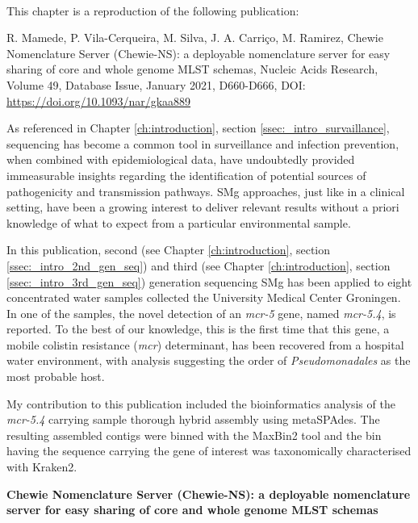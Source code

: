 \mbox{}\\
\vspace{8cm}

This chapter is a reproduction of the following publication:

R. Mamede, P. Vila-Cerqueira, M. Silva, J. A. Carriço, M. Ramirez, Chewie Nomenclature Server (Chewie-NS): a deployable nomenclature server for easy sharing of core and whole genome MLST schemas, Nucleic Acids Research, Volume 49, Database Issue, January 2021, D660-D666, DOI: \url{https://doi.org/10.1093/nar/gkaa889}

As referenced in Chapter \ref{ch:introduction}, section \ref{ssec:_intro_survaillance}, sequencing has become a common tool in surveillance and infection prevention, when combined with epidemiological data, have undoubtedly provided immeasurable insights regarding the identification of potential sources of pathogenicity and transmission pathways. \ac{SMg} approaches, just like in a clinical setting, have been a growing interest to deliver relevant results without a priori knowledge of what to expect from a particular environmental sample. 

In this publication, second (see Chapter \ref{ch:introduction}, section \ref{ssec:_intro_2nd_gen_seq}) and third (see Chapter \ref{ch:introduction}, section \ref{ssec:_intro_3rd_gen_seq}) generation sequencing \ac{SMg} has been applied to eight concentrated water samples collected the University Medical Center Groningen. In one of the samples, the novel detection of an \textit{mcr-5} gene, named \textit{mcr-5.4}, is reported. To the best of our knowledge, this is the first time that this gene, a mobile colistin resistance (\textit{mcr}) determinant, has been recovered from a hospital water environment, with analysis suggesting the order of \textit{Pseudomonadales} as the most probable host. 

My contribution to this publication included the bioinformatics analysis of the \textit{mcr-5.4} carrying sample thorough hybrid assembly using metaSPAdes. The resulting assembled contigs were binned with the MaxBin2 tool and the bin having the sequence carrying the gene of interest was taxonomically characterised with Kraken2.

\cleardoublepage 

\begin{center}
\large
\textbf{Chewie Nomenclature Server (Chewie-NS): a deployable nomenclature server for easy sharing of core and whole genome MLST schemas}
\end{center}

